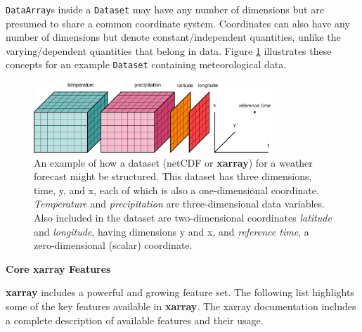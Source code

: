 \documentclass{jors}
\begin{document}
\verb|DataArray|s inside a \verb|Dataset| may have any number of dimensions but are presumed to share a common coordinate system.
Coordinates can also have any number of dimensions but denote constant/independent quantities, unlike the varying/dependent quantities that belong in data.
Figure \ref{fig:dataset_diagram} illustrates these concepts for an example \verb|Dataset| containing meteorological data.

\begin{figure}
	\centering
	\includegraphics[width=0.8\textwidth]{dataset-diagram_original}
	\caption{An example of how a dataset (netCDF or \textbf{xarray}) for a weather forecast might be structured. This dataset has three dimensions, time, y, and x, each of which is also a one-dimensional coordinate. \textit{Temperature} and \textit{precipitation} are three-dimensional data variables.  Also included in the dataset are two-dimensional coordinates \textit{latitude} and \textit{longitude}, having dimensions y and x, and \textit{reference time}, a zero-dimensional (scalar) coordinate.}
	\label{fig:dataset_diagram}
\end{figure}

\textbf{Core xarray Features}

\textbf{xarray} includes a powerful and growing feature set.
The following list highlights some of the key features available in \textbf{xarray}.
The xarray documentation \citep{xarray_docs} includes a complete description of available features and their usage.
\end{document}
